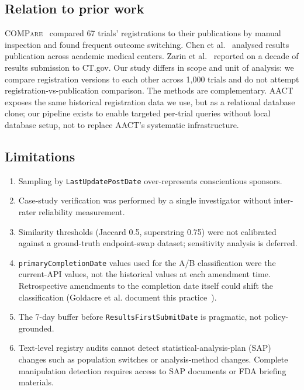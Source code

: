 \documentclass[11pt,a4paper]{article}
\begin{document}
\subsection{Relation to prior work}
\textsc{COMPare}~\cite{goldacre2019compare} compared 67 trials'
registrations to their publications by manual inspection and found
frequent outcome switching. Chen et al.~\cite{chen2016bmj} analysed
results publication across academic medical centers.
Zarin et al.~\cite{zarin2019ctgov} reported on a decade of results
submission to CT.gov. Our study differs in scope and unit of analysis:
we compare registration versions to each other across 1{,}000
trials and do not attempt registration-vs-publication comparison. The
methods are complementary. AACT~\cite{aact} exposes the same
historical registration data we use, but as a relational database
clone; our pipeline exists to enable targeted per-trial queries
without local database setup, not to replace AACT's systematic
infrastructure.

\subsection{Limitations}
\begin{enumerate}\setlength\itemsep{0.2em}
    \item Sampling by \texttt{LastUpdatePostDate} over-represents
          conscientious sponsors.
    \item Case-study verification was performed by a single investigator
          without inter-rater reliability measurement.
    \item Similarity thresholds (Jaccard 0.5, superstring 0.75)
          were not calibrated against a ground-truth endpoint-swap
          dataset; sensitivity analysis is deferred.
    \item \texttt{primaryCompletionDate} values used for the
          A/B classification were the current-API values, not the
          historical values at each amendment time. Retrospective
          amendments to the completion date itself could shift the
          classification (Goldacre et al. document this
          practice~\cite{goldacre2019compare}).
    \item The 7-day buffer before \texttt{ResultsFirstSubmitDate} is
          pragmatic, not policy-grounded.
    \item Text-level registry audits cannot detect
          statistical-analysis-plan (SAP) changes such as
          population switches or analysis-method changes. Complete
          manipulation detection requires access to SAP documents
          or FDA briefing materials.
\end{enumerate}
\end{document}
